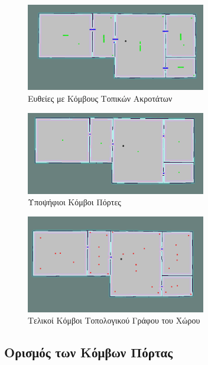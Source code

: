 \begin{figure}{\textwidth} 
    \centering
    \includegraphics[width=0.7\textwidth]{./images/chapter5/rooms_3_door_lines.png}
    \caption{Ευθείες με Κόμβους Τοπικών Ακροτάτων}
    \label{fig:rooms_3_door_lines}
\end{figure}
\begin{figure}{\textwidth} 
    \centering
    \includegraphics[width=0.7\textwidth]{./images/chapter5/rooms_3_doors.png}
    \caption{Υποψήφιοι Κόμβοι Πόρτες}
    \label{fig:rooms_3_doors}
\end{figure}
\begin{figure}{\textwidth} 
    \centering
    \includegraphics[width=0.7\textwidth]{./images/chapter5/rooms_3_nodes_with_doors.png}
    \caption{Τελικοί Κόμβοι Τοπολογικού Γράφου του Χώρου}
    \label{fig:rooms_3_nodes_with_doors}
\end{figure}


\subsection{Ορισμός των Κόμβων Πόρτας}
\label{subsection:find_door_nodes}

